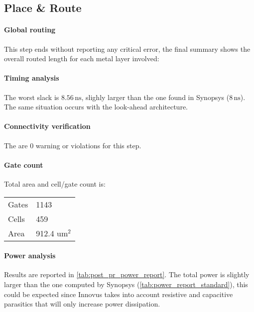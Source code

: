 \subsection{Place \& Route}
\paragraph{Global routing} This step ends without reporting any critical error, the final summary shows the overall routed length for each metal layer involved:


\paragraph{Timing analysis} The worst slack is $8.56\,\textrm{ns}$, slighly larger than the one found in Synopsys ($8\,\textrm{ns}$). The same situation occurs with the look-ahead architecture.


\paragraph{Connectivity verification} The are 0 warning or violations for this step.


\paragraph{Gate count} Total area and cell/gate count is:
\begin{center}
\begin{tabular}{|l|l|}
	\hline 
	Gates & 1143 \\
	Cells &     459 \\
	Area &     912.4 um$^2$\\\hline
\end{tabular}
\end{center}


\paragraph{Power analysis} Results are reported in \autoref{tab:post_pr_power_report}. The total power is slightly larger than the one computed by Synopsys (\autoref{tab:power_report_standard}), this could be expected since Innovus takes into account resistive and capacitive parasitics that will only increase power dissipation.

